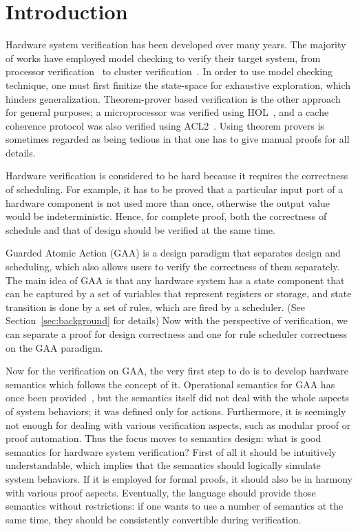 \section{Introduction}
Hardware system verification has been developed over many years. The
majority of works have employed model checking to verify their target
system, from processor verification~\cite{ProcVerif1, ProcVerif2} to
cluster verification~\cite{ClusterVerif}. In order to use model
checking technique, one must first finitize the state-space for
exhaustive exploration, which hinders generalization.  Theorem-prover
based verification is the other approach for general purposes; a
microprocessor was verified using HOL~\cite{MicroVerif}, and a cache
coherence protocol was also verified using ACL2~\cite{CCVerif}. Using
theorem provers is sometimes regarded as being tedious in that one has
to give manual proofs for all details.

Hardware verification is considered to be hard because it requires the
correctness of scheduling. For example, it has to be proved that a
particular input port of a hardware component is not used more than
once, otherwise the output value would be indeterministic. Hence, for
complete proof, both the correctness of schedule and that of design
should be verified at the same time.

Guarded Atomic Action (GAA) is a design paradigm that separates design
and scheduling, which also allows users to verify the correctness of
them separately. The main idea of GAA is that any hardware system has
a state component that can be captured by a set of variables that
represent registers or storage, and state transition is done by a set
of rules, which are fired by a scheduler. (See
Section~\ref{sec:background} for details) Now with the perspective of
verification, we can separate a proof for design correctness and one
for rule scheduler correctness on the GAA paradigm.

Now for the verification on GAA, the very first step to do is to
develop hardware semantics which follows the concept of it.
Operational semantics for GAA has once been provided~\cite{SemGAA},
but the semantics itself did not deal with the whole aspects of system
behaviors; it was defined only for actions. Furthermore, it is
seemingly not enough for dealing with various verification aspects,
such as modular proof or proof automation. Thus the focus moves to
semantics design: what is good semantics for hardware system
verification? First of all it should be intuitively understandable,
which implies that the semantics should logically simulate system
behaviors. If it is employed for formal proofs, it should also be in
harmony with various proof aspects. Eventually, the language should
provide those semantics without restrictions: if one wants to use a
number of semantics at the same time, they should be consistently
convertible during verification.

